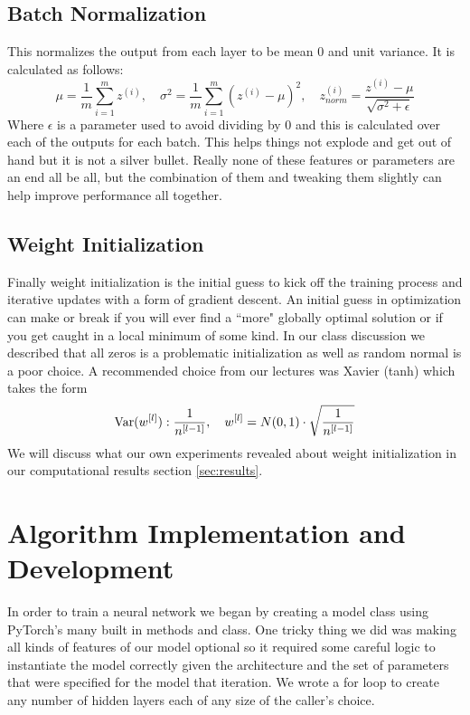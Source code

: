 \documentclass[10pt]{amsart}
\begin{document}
\subsection{Batch Normalization}
This normalizes the output from each layer to be mean 0 and unit variance.
It is calculated as follows:
\begin{equation}
\mu = \frac 1 m \sum_{i = 1}^m z^{(i)}, \quad
\sigma^2 = \frac 1 m \sum_{i = 1}^m \left( z^{(i)} - \mu \right)^2, \quad
z_{norm}^{(i)} = \frac {z^{(i)} - \mu}{\sqrt{\sigma^2 + \epsilon}}
\label{eq:bn}
\end{equation}
Where $\epsilon$ is a parameter used to avoid dividing by 0 and this is calculated over each of the outputs for each batch.
This helps things not explode and get out of hand but it is not a silver bullet.
Really none of these features or parameters are an end all be all, but the combination of them and tweaking them slightly can help improve performance all together.

\subsection{Weight Initialization}
Finally weight initialization is the initial guess to kick off the training process and iterative updates with a form of gradient descent.
An initial guess in optimization can make or break if you will ever find a ``more" globally optimal solution or if you get caught in a local minimum of some kind.
In our class discussion we described that all zeros is a problematic initialization as well as random normal is a poor choice.
A recommended choice from our lectures was Xavier (tanh) which takes the form
\begin{equation}
{\rm Var} ( w^{[l]}): \frac 1 {n^{[l - 1]}}, \quad 
w^{[l]} = N(0, 1) \cdot \sqrt{ \frac 1 {n^{[l - 1]}} }
\label{eq:weight_init}
\end{equation}
We will discuss what our own experiments revealed about weight initialization in our computational results section \ref{sec:results}.

\section{Algorithm Implementation and Development}\label{sec:algorithms}
In order to train a neural network we began by creating a model class using PyTorch's \cite{Ansel_PyTorch_2_Faster_2024} many built in methods and class.
One tricky thing we did was making all kinds of features of our model optional so it required some careful logic to instantiate the model correctly given the architecture and the set of parameters that were specified for the model that iteration.
We wrote a for loop to create any number of hidden layers each of any size of the caller's choice.
\end{document}
